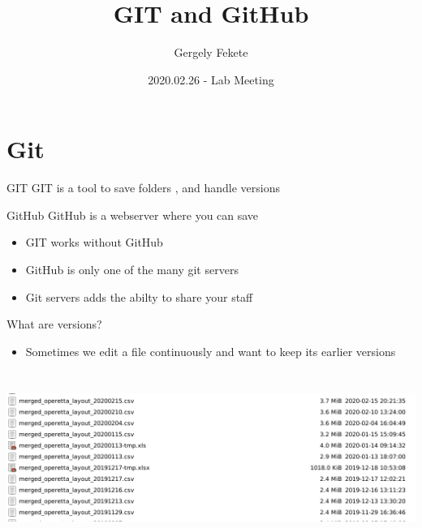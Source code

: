 \documentclass[aspectratio=169]{beamer}
\title{GIT and GitHub}
\author{Gergely Fekete}
\date{2020.02.26 -  Lab Meeting}
\begin{document}
\begin{frame}
\titlepage
\end{frame}

\section{Git}




\begin{frame}

\begin{block}{GIT}
GIT is a  tool to save folders , and handle versions
\end{block}


\begin{block}{GitHub}
GitHub is a webserver where you can save 
\end{block}



\begin{itemize}
\item GIT works without GitHub
\item GitHub is only one of the many git servers
\item Git servers adds the abilty to share your staff
\end{itemize}
 
\end{frame}



\begin{frame}

What are versions? 


\begin{itemize}
\item Sometimes we edit a file continuously and want to keep its earlier versions
\end{itemize}
\includegraphics[height=160pt]{pictures/Screenshot_2020-02-25_17-47-03-ugly_folder-zoom_in.png}

\end{frame}
\end{document}
